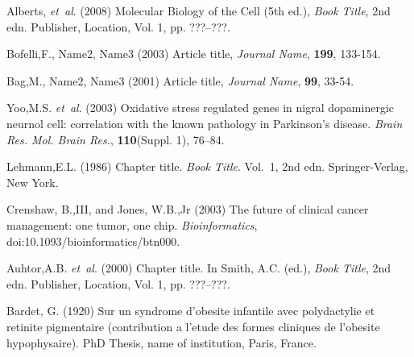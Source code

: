 \documentclass{bioinfo}
\begin{document}
%
%
%
%
%
%
%
%
%


\begin{thebibliography}{}

Alberts, \textit{et~al}. (2008) Molecular Biology of the Cell
(5th ed.), \textit{Book Title}, 2nd edn. Publisher, Location, Vol. 1, pp.
???--???.



Bofelli,F., Name2, Name3 (2003) Article title, {\it Journal Name}, {\bf 199}, 133-154.

Bag,M., Name2, Name3 (2001) Article title, {\it Journal Name}, {\bf 99}, 33-54.

Yoo,M.S. \textit{et~al}. (2003) Oxidative stress regulated genes
in nigral dopaminergic neurnol cell: correlation with the known
pathology in Parkinson's disease. \textit{Brain Res. Mol. Brain
Res.}, \textbf{110}(Suppl. 1), 76--84.

Lehmann,E.L. (1986) Chapter title. \textit{Book Title}. Vol.~1, 2nd edn. Springer-Verlag, New York.

Crenshaw, B.,III, and Jones, W.B.,Jr (2003) The future of clinical
cancer management: one tumor, one chip. \textit{Bioinformatics},
doi:10.1093/bioinformatics/btn000.

Auhtor,A.B. \textit{et~al}. (2000) Chapter title. In Smith, A.C.
(ed.), \textit{Book Title}, 2nd edn. Publisher, Location, Vol. 1, pp.
???--???.

Bardet, G. (1920) Sur un syndrome d'obesite infantile avec
polydactylie et retinite pigmentaire (contribution a l'etude des
formes cliniques de l'obesite hypophysaire). PhD Thesis, name of
institution, Paris, France.

\end{thebibliography}
\end{document}
